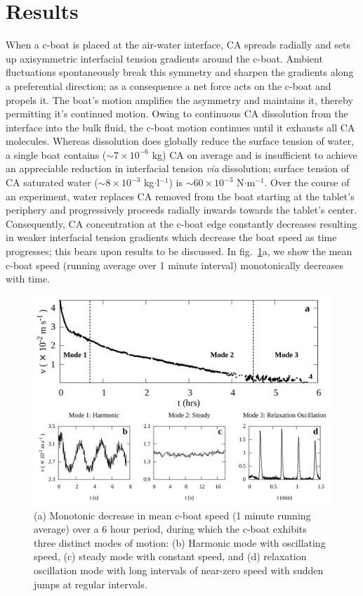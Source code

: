 \documentclass[journal=langd5, manuscript=article, layout=twocolumn]{achemso}
\begin{document}
\section{Results}
\label{resultsec}
When a c-boat is placed at the air-water interface, CA spreads radially and sets up axisymmetric interfacial tension gradients around the c-boat. Ambient fluctuations spontaneously break this symmetry and sharpen the gradients along a preferential direction; as a consequence a net force acts on the c-boat and propels it. The boat's motion amplifies the asymmetry and maintains it, thereby permitting it's continued motion. Owing to continuous CA dissolution from the interface into the bulk fluid, the c-boat motion continues until it exhausts all CA molecules. Whereas dissolution does globally reduce the surface tension of water, a single boat contains  ($\sim 7 \times 10^{-6}$ kg) CA on average and is insufficient to achieve an appreciable reduction in interfacial tension {\it via} dissolution; surface tension of CA saturated water ($\sim 8 \times 10^{-3}$ kg$\cdot$l$^{-1}$) is $\sim 60\times 10^{-3}$ N$\cdot$m$^{-1}$. Over the course of an experiment, water replaces CA removed from the boat starting at the tablet's periphery and progressively proceeds radially inwards towards the tablet's center. Consequently, CA concentration at the c-boat edge constantly decreases resulting in weaker interfacial tension gradients which decrease the boat speed as time progresses; this bears upon results to be discussed. In fig.~\ref{fig2}a, we show the mean c-boat speed (running average over 1 minute interval) monotonically decreases with time.


\begin{figure}[ht]
\centering
\includegraphics[width=0.85\linewidth]{figure2_v2.pdf}
\caption{(a) Monotonic decrease in mean c-boat speed (1 minute running average) over a 6 hour period, during which the c-boat exhibits three distinct modes of motion: (b) Harmonic mode with oscillating speed, (c) steady mode with constant speed, and (d) relaxation oscillation mode with long intervals of near-zero speed with sudden jumps at regular intervals.}
\label{fig2}
\end{figure}
\end{document}
